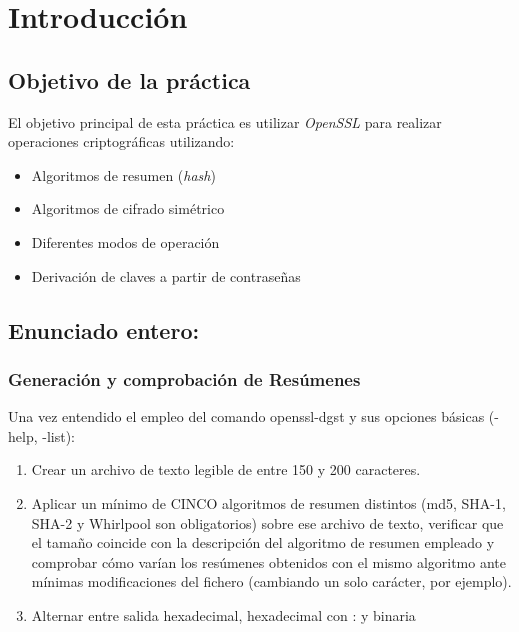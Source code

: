 \chapter{Introducción}

\section{Objetivo de la práctica}

El objetivo principal de esta práctica es utilizar \textit{OpenSSL} para realizar 
operaciones criptográficas utilizando:

\begin{itemize}[label=\textbullet]
    \item Algoritmos de resumen (\textit{hash})
    \item Algoritmos de cifrado simétrico
    \item Diferentes modos de operación
    \item Derivación de claves a partir de contraseñas
\end{itemize}

\section{Enunciado entero:}
\subsection{Generación y comprobación de Resúmenes}
Una vez entendido el empleo del comando openssl-dgst y sus opciones básicas (-help, -list):
\begin{enumerate}
    \item Crear un archivo de texto legible de entre 150 y 200 caracteres.
    \item Aplicar un mínimo de CINCO algoritmos de resumen distintos (md5, SHA-1, SHA-2 y
    Whirlpool son obligatorios) sobre ese archivo de texto, verificar que el tamaño coincide con
    la descripción del algoritmo de resumen empleado y comprobar cómo varían los resúmenes
    obtenidos con el mismo algoritmo ante mínimas modificaciones del fichero (cambiando un
    solo carácter, por ejemplo).
    \item Alternar entre salida hexadecimal, hexadecimal con : y binaria
\end{enumerate}
